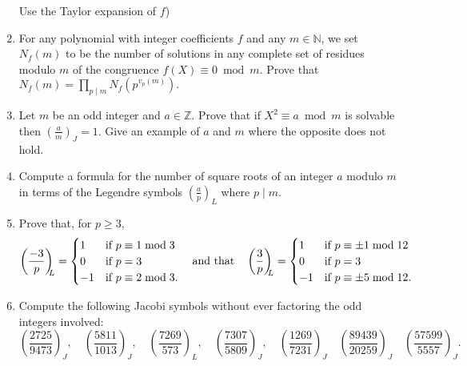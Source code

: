 \documentclass[a4paper,12pt]{article}
\begin{document}
\begin{enumerate}
{{{ Use the Taylor expansion of $f$})}}
 \item For any polynomial with integer coefficients $f$ and any $m\in\mathbb N$, we set $N_f(m)$ to be the number of solutions in 
 any complete set of residues modulo $m$  of the congruence $f(X)\equiv 0\bmod m$. Prove that $N_f(m)=\prod_{p\mid m}N_f(p^{v_p(m)}).$
 \item Let $m$ be an odd integer and $a\in\mathbb Z$. Prove that if $X^2\equiv a\bmod m$ is solvable then $\left(\frac am\right)_{\!\!\!J}=1$.
 Give an example of $a$ and $m$ where the opposite does not hold.
 \item Compute a formula for the number of square roots of an integer $a$ modulo $m$ in terms of the Legendre symbols $\left(\frac ap\right)_{\!\!\!L}$
 where $p\mid m$.
 \item Prove that, for $p\ge3$, 
 $$\left(\frac{-3}p\right)_{\!\!\!L}=\begin{cases}1&\text{if }p\equiv1\bmod3\\ 0&\text{if }p=3\\-1&\text{if }p\equiv2\bmod3.    
   \end{cases}\text{\quad and that\quad}\left(\frac{3}p\right)_{\!\!\!L}=\begin{cases}1&\text{if }p\equiv\pm1\bmod 12\\ 0&\text{if }p=3\\-1&\text{if }p\equiv\pm5\bmod12.    
   \end{cases}$$
   \item Compute the following Jacobi symbols without ever factoring the odd integers involved:
   $$\left(\frac{2725}{9473}\right)_{\!\!\!J},\quad\left(\frac{5811}{1013}\right)_{\!\!\!J},\quad\left(\frac{7269}{573}\right)_{\!\!\!L},
   \quad\left(\frac{7307}{5809}\right)_{\!\!\!J},
    \quad\left(\frac{1269}{7231}\right)_{\!\!\!J}\quad\left(\frac{89439}{20259}\right)_{\!\!\!J}
 \quad\left(\frac{57599}{5557}\right)_{\!\!\!J}.$$
  \end{enumerate}
\end{document}
